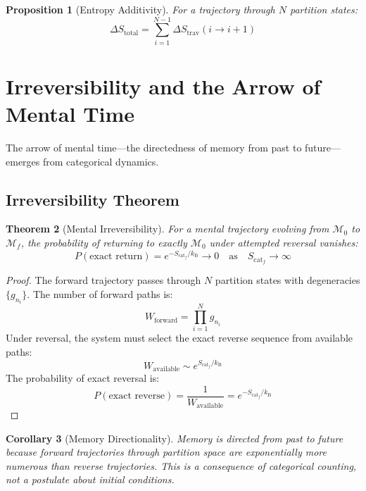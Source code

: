 \documentclass[aps,prd,twocolumn,superscriptaddress,floatfix,nofootinbib]{revtex4-2}
\newtheorem{theorem}{Theorem}[section]
\newtheorem{corollary}[theorem]{Corollary}
\newtheorem{proposition}[theorem]{Proposition}
\theoremstyle{remark}
\newcommand{\kB}{k_{\mathrm{B}}}
\newcommand{\Mstate}{\mathcal{M}}
\newcommand{\Scatent}{S_{\mathrm{cat}}}
\begin{document}
\begin{proposition}[Entropy Additivity]
For a trajectory through $N$ partition states:
\begin{equation}
\Delta S_{\text{total}} = \sum_{i=1}^{N-1} \Delta S_{\text{trav}}(i \to i+1)
\end{equation}
\end{proposition}

\section{Irreversibility and the Arrow of Mental Time}
\label{sec:irreversibility}

The arrow of mental time---the directedness of memory from past to future---emerges from categorical dynamics.

\subsection{Irreversibility Theorem}

\begin{theorem}[Mental Irreversibility]
\label{thm:mental_irreversibility}
For a mental trajectory evolving from $\Mstate_0$ to $\Mstate_f$, the probability of returning to exactly $\Mstate_0$ under attempted reversal vanishes:
\begin{equation}
P(\text{exact return}) = e^{-\Scatent_f/\kB} \to 0 \quad \text{as} \quad \Scatent_f \to \infty
\end{equation}
\end{theorem}

\begin{proof}
The forward trajectory passes through $N$ partition states with degeneracies $\{g_{n_i}\}$. The number of forward paths is:
\begin{equation}
W_{\text{forward}} = \prod_{i=1}^{N} g_{n_i}
\end{equation}
Under reversal, the system must select the exact reverse sequence from available paths:
\begin{equation}
W_{\text{available}} \sim e^{\Scatent_f/\kB}
\end{equation}
The probability of exact reversal is:
\begin{equation}
P(\text{exact reverse}) = \frac{1}{W_{\text{available}}} = e^{-\Scatent_f/\kB}
\end{equation}
\end{proof}

\begin{corollary}[Memory Directionality]
\label{cor:memory_direction}
Memory is directed from past to future because forward trajectories through partition space are exponentially more numerous than reverse trajectories. This is a consequence of categorical counting, not a postulate about initial conditions.
\end{corollary}
\end{document}
